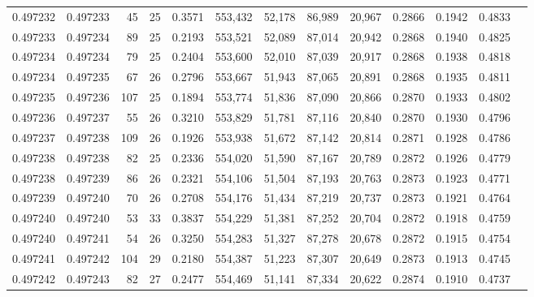 \begin{tabular}{rrrrrrrrrrrrr}
0.497232 & 0.497233 &  45 &  25 &                                     0.3571 & 553,432 &  52,178 &  86,989 &  20,967 & 0.2866 & 0.1942 & 0.4833 \\
0.497233 & 0.497234 &  89 &  25 &                                     0.2193 & 553,521 &  52,089 &  87,014 &  20,942 & 0.2868 & 0.1940 & 0.4825 \\
0.497234 & 0.497234 &  79 &  25 &                                     0.2404 & 553,600 &  52,010 &  87,039 &  20,917 & 0.2868 & 0.1938 & 0.4818 \\
0.497234 & 0.497235 &  67 &  26 &                                     0.2796 & 553,667 &  51,943 &  87,065 &  20,891 & 0.2868 & 0.1935 & 0.4811 \\
0.497235 & 0.497236 & 107 &  25 &                                     0.1894 & 553,774 &  51,836 &  87,090 &  20,866 & 0.2870 & 0.1933 & 0.4802 \\
0.497236 & 0.497237 &  55 &  26 &                                     0.3210 & 553,829 &  51,781 &  87,116 &  20,840 & 0.2870 & 0.1930 & 0.4796 \\
0.497237 & 0.497238 & 109 &  26 &                                     0.1926 & 553,938 &  51,672 &  87,142 &  20,814 & 0.2871 & 0.1928 & 0.4786 \\
0.497238 & 0.497238 &  82 &  25 &                                     0.2336 & 554,020 &  51,590 &  87,167 &  20,789 & 0.2872 & 0.1926 & 0.4779 \\
0.497238 & 0.497239 &  86 &  26 &                                     0.2321 & 554,106 &  51,504 &  87,193 &  20,763 & 0.2873 & 0.1923 & 0.4771 \\
0.497239 & 0.497240 &  70 &  26 &                                     0.2708 & 554,176 &  51,434 &  87,219 &  20,737 & 0.2873 & 0.1921 & 0.4764 \\
0.497240 & 0.497240 &  53 &  33 &                                     0.3837 & 554,229 &  51,381 &  87,252 &  20,704 & 0.2872 & 0.1918 & 0.4759 \\
0.497240 & 0.497241 &  54 &  26 &                                     0.3250 & 554,283 &  51,327 &  87,278 &  20,678 & 0.2872 & 0.1915 & 0.4754 \\
0.497241 & 0.497242 & 104 &  29 &                                     0.2180 & 554,387 &  51,223 &  87,307 &  20,649 & 0.2873 & 0.1913 & 0.4745 \\
0.497242 & 0.497243 &  82 &  27 &                                     0.2477 & 554,469 &  51,141 &  87,334 &  20,622 & 0.2874 & 0.1910 & 0.4737 \\

\end{tabular}
